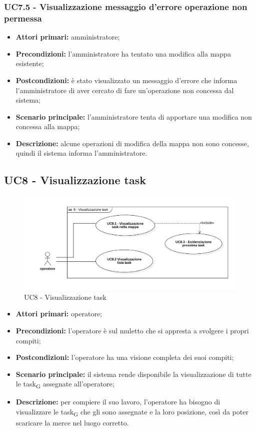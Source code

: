 \subsubsection{UC7.5 - Visualizzazione messaggio d'errore operazione non permessa}
\begin{itemize}
	\item 	\textbf{Attori primari:} amministratore;
	\item 	\textbf{Precondizioni:} l'amministratore ha tentato una modifica alla mappa esistente;
	\item 	\textbf{Postcondizioni:} è stato visualizzato un messaggio d'errore che informa l'amministratore di aver cercato di fare un'operazione non concessa dal sistema;
	\item 	\textbf{Scenario principale:} l'amministratore tenta di apportare una modifica non concessa alla mappa;
	\item 	\textbf{Descrizione:} alcune operazioni di modifica della mappa non sono concesse, quindi il sistema informa l'amministratore.
\end{itemize}

\subsection{UC8 - Visualizzazione task}

\begin{figure}[H]
	\centering
	\includegraphics[scale=0.52]{res/images/uc8.png}
	\caption{UC8 - Visualizzazione task}
\end{figure}


\begin{itemize}
	\item 	\textbf{Attori primari:} operatore;
	\item 	\textbf{Precondizioni:} l'operatore è sul muletto che si appresta a svolgere i propri compiti;
	\item 	\textbf{Postcondizioni:} l'operatore ha una visione completa dei suoi compiti;
	\item 	\textbf{Scenario principale:} il sistema rende disponibile la visualizzazione di tutte le task\textsubscript{G} assegnate all'operatore;
	\item 	\textbf{Descrizione:} per compiere il suo lavoro, l'operatore ha bisogno di visualizzare le task\textsubscript{G} che gli sono assegnate e la loro posizione, così da poter scaricare la merce nel luogo corretto.

\end{itemize}


